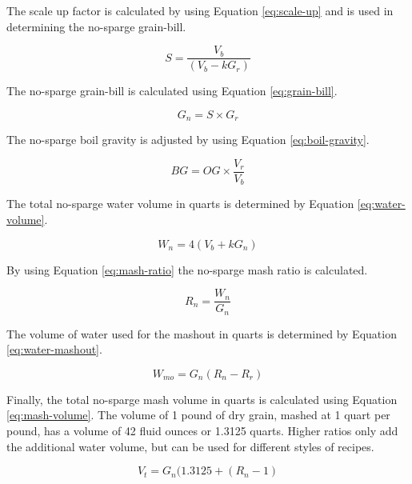 \documentclass{article}
\begin{document}
\noindent The scale up factor is calculated by using Equation \ref{eq:scale-up} and is used in determining the no-sparge \gls{grain-bill}.

\begin{equation}
S = \frac{V_{b}}{(V_{b} - kG_{r})}
\label{eq:scale-up}
\end{equation}

\noindent The no-sparge \gls{grain-bill} is calculated using Equation \ref{eq:grain-bill}.

\begin{equation}
G_{n} = S \times G_{r}
\label{eq:grain-bill}
\end{equation}

\noindent The no-sparge boil gravity is adjusted by using Equation \ref{eq:boil-gravity}.

\begin{equation}
BG = OG \times \frac{V_{r}}{V_{b}}
\label{eq:boil-gravity}
\end{equation}

\noindent The total no-sparge water volume in quarts is determined by Equation \ref{eq:water-volume}.

\begin{equation}
W_{n} = 4(V_{b} + kG_{n})
\label{eq:water-volume}
\end{equation}

\noindent By using Equation \ref{eq:mash-ratio} the no-sparge mash ratio is calculated.

\begin{equation}
R_{n} = \frac{W_{n}}{G_{n}}
\label{eq:mash-ratio}
\end{equation}

\noindent The volume of water used for the mashout in quarts is determined by Equation \ref{eq:water-mashout}.

\begin{equation}
W_{mo} = G_{n}(R_{n} - R_{r})
\label{eq:water-mashout}
\end{equation}

\noindent Finally, the total no-sparge mash volume in quarts is calculated using Equation \ref{eq:mash-volume}.  The volume of 1 pound of dry grain, mashed at 1 quart per pound, has a volume of 42 fluid ounces or 1.3125 quarts. Higher ratios only add the additional water volume, but can be used for different styles of recipes.

\begin{equation}
V_{t} = G_{n}(1.3125 + (R_{n} - 1)
\label{eq:mash-volume}
\end{equation}
\end{document}
